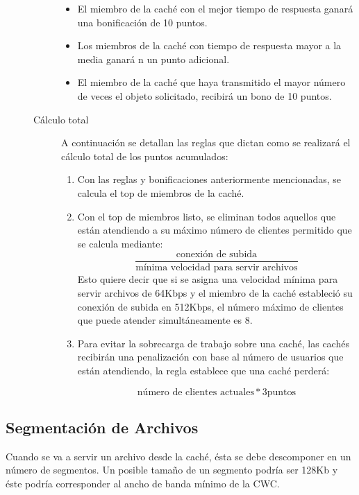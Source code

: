 \begin{description}
\begin{description}
		\begin{itemize}
		\item El miembro de la caché con el mejor tiempo de respuesta ganará una bonificación de 10 puntos.
		\item Los miembros de la caché con tiempo de respuesta mayor a la media ganará	n un punto adicional.
		\item El miembro de la caché que haya transmitido el mayor número de veces el  objeto solicitado, recibirá un bono de 10 puntos.
		\end{itemize}

	\item[Cálculo total] A continuación se detallan las reglas que dictan como se realizará el cálculo total de los puntos acumulados: 
	
		\begin{enumerate}
		\item Con las reglas y bonificaciones anteriormente mencionadas, se calcula el top de miembros de la caché.
		\item Con el top de miembros listo, se eliminan todos aquellos que están atendiendo a su máximo número de clientes permitido que se calcula mediante: 
		$$ \frac {\text{conexión de subida}}{\text{mínima velocidad para servir archivos}} $$ 
		Esto quiere decir que si se asigna una velocidad mínima para servir archivos de 64Kbps y el miembro de la caché estableció su conexión de subida en 512Kbps, el número máximo de clientes que puede atender simultáneamente es 8.
		\item Para evitar la sobrecarga de trabajo sobre una caché, las cachés recibirán una penalización con base al número de usuarios que están atendiendo, la regla establece que una caché perderá: 
		
		$$ \text{número de clientes actuales} * 3 \text{puntos} $$
		\end{enumerate}
	
	\end{description}

\end{description}


\subsection{Segmentación de Archivos}

Cuando se va a servir un archivo desde la caché, ésta se debe descomponer en un número de segmentos. Un posible tamaño de un segmento podría ser 128Kb y éste podría corresponder al ancho de banda mínimo de la CWC. 

